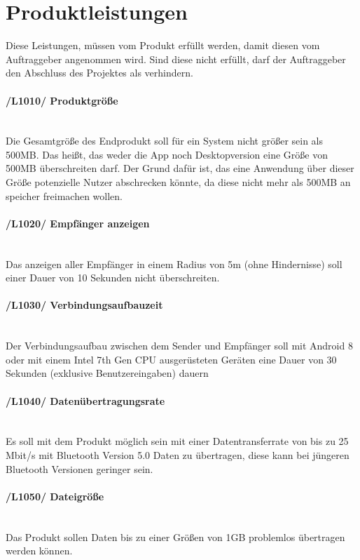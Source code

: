 \section{Produktleistungen}
Diese Leistungen, müssen vom Produkt erfüllt werden, damit diesen vom Auftraggeber angenommen wird. Sind diese nicht erfüllt, darf der Auftraggeber den Abschluss des Projektes als verhindern.
\begin{indentE}\mbox{}
	\paragraph{/L1010/ Produktgröße}\mbox{}\\
	Die Gesamtgröße des Endprodukt soll für ein System nicht größer sein als 500MB. Das heißt, das weder die App noch Desktopversion eine Größe von 500MB überschreiten darf. Der Grund dafür ist, das eine Anwendung über dieser Größe potenzielle Nutzer abschrecken könnte, da diese nicht mehr als 500MB an speicher freimachen wollen.
	\paragraph{/L1020/ Empfänger anzeigen}\mbox{}\\
	Das anzeigen aller Empfänger in einem Radius von 5m (ohne Hindernisse) soll einer Dauer von 10 Sekunden nicht überschreiten.
	\paragraph{/L1030/ Verbindungsaufbauzeit}\mbox{}\\
	Der Verbindungsaufbau zwischen dem Sender und Empfänger soll mit Android 8 oder mit einem Intel 7th Gen CPU ausgerüsteten Geräten eine Dauer von 30 Sekunden (exklusive Benutzereingaben) dauern
	\paragraph{/L1040/ Datenübertragungsrate}\mbox{}\\
	Es soll mit dem Produkt möglich sein mit einer Datentransferrate von bis zu 25 Mbit/s mit Bluetooth Version 5.0 Daten zu übertragen, diese kann bei jüngeren Bluetooth Versionen geringer sein.
	\paragraph{/L1050/ Dateigröße}\mbox{}\\
	Das Produkt sollen Daten bis zu einer Größen von 1GB problemlos übertragen werden können.

\end{indentE}

